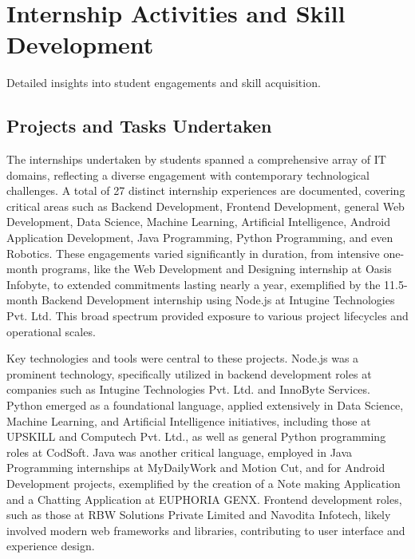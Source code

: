 \documentclass[11pt,a4paper]{article}
\newenvironment{card}{
    \begin{tcolorbox}[
        enhanced,
        colback=cardback,
        colframe=border,
        sharp corners,
        boxrule=0.5pt,
        drop shadow,
        drop shadow={shadow xshift=1mm,shadow yshift=-1mm,fill=border!50},
        boxsep=3mm,
        left=5mm, right=5mm, top=5mm, bottom=5mm,
        width=\textwidth,
        nobeforeafter
    ]
}{\end{tcolorbox}}
\begin{document}
\clearpage

\section*{\textcolor{accent}{Internship Activities and Skill Development}}
{\large\textcolor{muted}{Detailed insights into student engagements and skill acquisition.}}

\vspace{0.5cm}

\begin{card}
    \subsection*{\textcolor{accent}{Projects and Tasks Undertaken}}
    \vspace{0.3cm}
    The internships undertaken by students spanned a comprehensive array of IT domains, reflecting a diverse engagement with contemporary technological challenges. A total of 27 distinct internship experiences are documented, covering critical areas such as Backend Development, Frontend Development, general Web Development, Data Science, Machine Learning, Artificial Intelligence, Android Application Development, Java Programming, Python Programming, and even Robotics. These engagements varied significantly in duration, from intensive one-month programs, like the Web Development and Designing internship at Oasis Infobyte, to extended commitments lasting nearly a year, exemplified by the 11.5-month Backend Development internship using Node.js at Intugine Technologies Pvt. Ltd. This broad spectrum provided exposure to various project lifecycles and operational scales.

    Key technologies and tools were central to these projects. Node.js was a prominent technology, specifically utilized in backend development roles at companies such as Intugine Technologies Pvt. Ltd. and InnoByte Services. Python emerged as a foundational language, applied extensively in Data Science, Machine Learning, and Artificial Intelligence initiatives, including those at UPSKILL and Computech Pvt. Ltd., as well as general Python programming roles at CodSoft. Java was another critical language, employed in Java Programming internships at MyDailyWork and Motion Cut, and for Android Development projects, exemplified by the creation of a Note making Application and a Chatting Application at EUPHORIA GENX. Frontend development roles, such as those at RBW Solutions Private Limited and Navodita Infotech, likely involved modern web frameworks and libraries, contributing to user interface and experience design.


\end{card}
\end{document}
